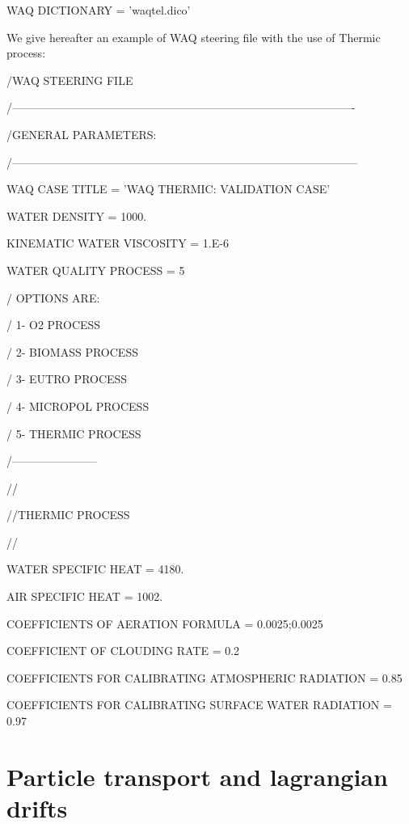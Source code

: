 \documentclass{article} %
\begin{document}
 WAQ DICTIONARY         = 'waqtel.dico'

 We give hereafter an example of WAQ steering file with the use of Thermic process:



 /WAQ STEERING FILE

 /-------------------------------------------------------------------------------------------

 /GENERAL PARAMETERS:

 /--------------------------------------------------------------------------------------------

 WAQ CASE TITLE                = 'WAQ THERMIC: VALIDATION CASE'

 WATER DENSITY                 = 1000.

 KINEMATIC WATER VISCOSITY      = 1.E-6

 WATER QUALITY PROCESS         = 5

 /   OPTIONS ARE:

 /       1- O2 PROCESS

 /       2- BIOMASS PROCESS

 /       3- EUTRO PROCESS

 /       4- MICROPOL PROCESS

 /       5- THERMIC PROCESS

 /-----------------------

 //

 //THERMIC PROCESS

 //

 WATER SPECIFIC HEAT                                 = 4180.

 AIR SPECIFIC HEAT                                        = 1002.

 COEFFICIENTS OF AERATION FORMULA    = 0.0025;0.0025

 COEFFICIENT OF CLOUDING RATE                       = 0.2

 COEFFICIENTS FOR CALIBRATING ATMOSPHERIC RADIATION = 0.85

 COEFFICIENTS FOR CALIBRATING SURFACE WATER RADIATION = 0.97










\section{ Particle transport and lagrangian drifts}
\end{document}
